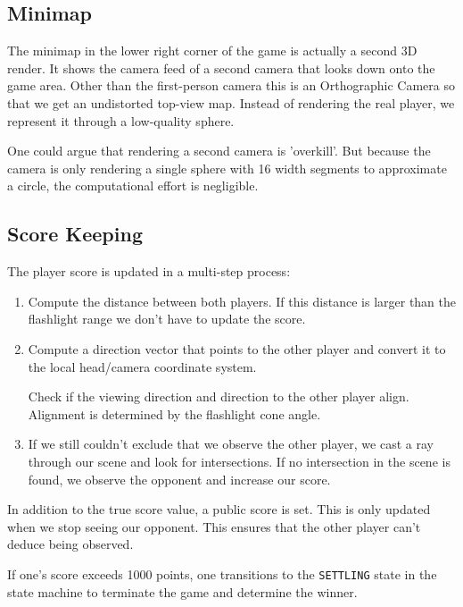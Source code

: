 \documentclass[11pt]{article}
\begin{document}
\subsection{Minimap}
\par The minimap in the lower right corner of the game is actually a second 3D render. It shows the camera feed of a second camera that looks down onto the game area. Other than the first-person camera this is an Orthographic Camera so that we get an undistorted top-view map. Instead of rendering the real player, we represent it through a low-quality sphere.
\par One could argue that rendering a second camera is 'overkill'. But because the camera is only rendering a single sphere with 16 width segments to approximate a circle, the computational effort is negligible.

\subsection{Score Keeping}
\par The player score is updated in a multi-step process:
\begin{enumerate}
	\item Compute the distance between both players. If this distance is larger than the flashlight range we don't have to update the score.
	\item Compute a direction vector that points to the other player and convert it to the local head/camera coordinate system.
		\par Check if the viewing direction and direction to the other player align. Alignment is determined by the flashlight cone angle.
	\item If we still couldn't exclude that we observe the other player, we cast a ray through our scene and look for intersections. If no intersection in the scene is found, we observe the opponent and increase our score.
\end{enumerate}
\par In addition to the true score value, a public score is set. This is only updated when we stop seeing our opponent. This ensures that the other player can't deduce being observed.
\par If one's score exceeds 1000 points, one transitions to the \texttt{SETTLING} state in the state machine to terminate the game and determine the winner.
\end{document}
